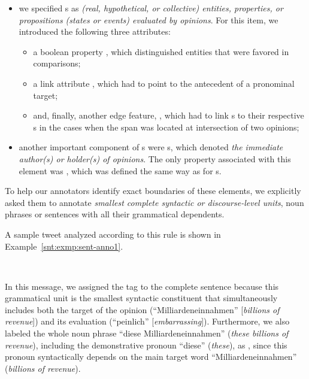 \begin{itemize}
\item
  we specified \textbf{}s as \emph{(real,
    hypothetical, or collective) entities, properties, or propositions
    (states or events) evaluated by opinions}.  For this item, we
  introduced the following three attributes:
  \begin{itemize}
    \item
      a boolean property , which distinguished
      entities that were favored in comparisons;
    \item
      a link attribute , which had to point to the
      antecedent of a pronominal target;
    \item and, finally, another edge feature,
      , which had to link s
      to their respective s in the cases when the
       span was located at intersection of two
      opinions;
  \end{itemize}

\item
  another important component of s were
  \textbf{}s, which denoted \emph{the immediate
    author(s) or holder(s) of opinions}.  The only property associated
  with this element was , which was defined
  the same way as for s.
\end{itemize}
To help our annotators identify exact boundaries of these elements, we
explicitly asked them to annotate \emph{smallest complete syntactic or
  discourse-level units}, \ie{} noun phrases or sentences with all
their grammatical dependents.

A sample tweet analyzed according to this rule is shown in
Example~\ref{snt:exmp:sent-anno1}.
\begin{example}\label{snt:exmp:sent-anno1}
  \upshape{}\\[0.8em]
  \noindent{}
\end{example}
In this message, we assigned the  tag to the
complete sentence because this grammatical unit is the smallest
syntactic constituent that simultaneously includes both the target of
the opinion (``Milliardeneinnahmen'' [\emph{billions of revenue}]) and
its evaluation (``peinlich'' [\emph{embarrassing}]).  Furthermore, we
also labeled the whole noun phrase ``diese Milliardeneinnahmen''
(\emph{these billions of revenue}), including the demonstrative
pronoun ``diese'' (\emph{these}), as , since this
pronoun syntactically depends on the main target word
``Milliardeneinnahmen'' (\emph{billions of revenue}).

